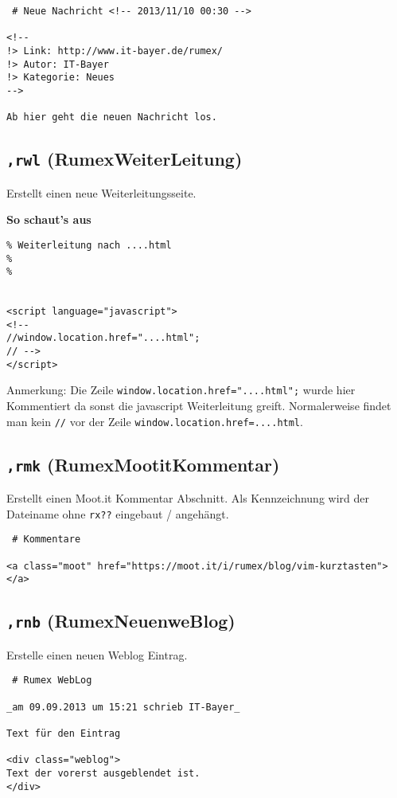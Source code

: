 \begin{verbatim}
 # Neue Nachricht <!-- 2013/11/10 00:30 -->

<!--
!> Link: http://www.it-bayer.de/rumex/
!> Autor: IT-Bayer
!> Kategorie: Neues
-->

Ab hier geht die neuen Nachricht los.
\end{verbatim}

\subsection{\texttt{,rwl}
(RumexWeiterLeitung)}\label{rwl-rumexweiterleitung}

Erstellt einen neue Weiterleitungsseite.

\textbf{So schaut's aus}

\begin{verbatim}
% Weiterleitung nach ....html
%
%


<script language="javascript">
<!--
//window.location.href="....html";
// -->
</script>
\end{verbatim}

Anmerkung: Die Zeile \texttt{window.location.href="....html";} wurde
hier Kommentiert da sonst die javascript Weiterleitung greift.
Normalerweise findet man kein \texttt{//} vor der Zeile
\texttt{window.location.href=....html}.

\subsection{\texttt{,rmk}
(RumexMootitKommentar)}\label{rmk-rumexmootitkommentar}

Erstellt einen Moot.it Kommentar Abschnitt. Als Kennzeichnung wird der
Dateiname ohne \texttt{rx??} eingebaut / angehängt.

\begin{verbatim}
 # Kommentare

<a class="moot" href="https://moot.it/i/rumex/blog/vim-kurztasten"></a>
\end{verbatim}

\subsection{\texttt{,rnb}
(RumexNeuenweBlog)}\label{rnb-rumexneuenweblog}

Erstelle einen neuen Weblog Eintrag.

\begin{verbatim}
 # Rumex WebLog

_am 09.09.2013 um 15:21 schrieb IT-Bayer_

Text für den Eintrag

<div class="weblog">
Text der vorerst ausgeblendet ist.
</div>
\end{verbatim}


